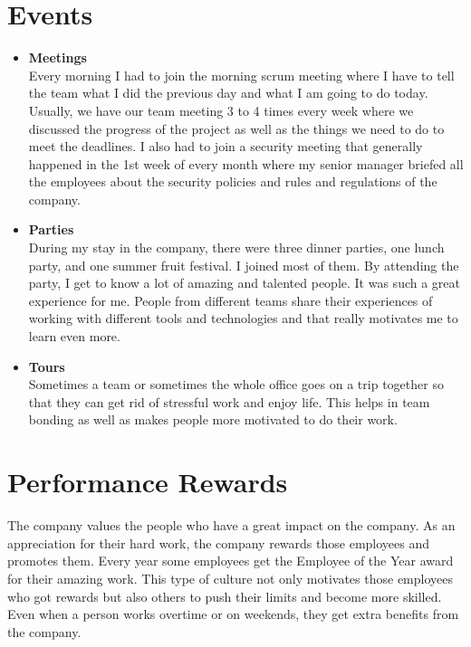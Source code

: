 \section{Events}
\begin{flushleft}
\begin{itemize}
    \item \textbf{Meetings}\\
    \vspace{6pt}
Every morning I had to join the morning scrum meeting where I have to tell the team
what I did the previous day and what I am going to do today. Usually, we have our team
meeting 3 to 4 times every week where we discussed the progress of the project as well
as the things we need to do to meet the deadlines.
I also had to join a security meeting that generally happened in the 1st week of every
month where my senior manager briefed all the employees about the security policies
and rules and regulations of the company.
\item \textbf{Parties}\\
\vspace{6pt}
During my stay in the company, there were three dinner parties, one lunch party, and
one summer fruit festival. I joined most of them. By attending the party, I get to know a
lot of amazing and talented people. It was such a great experience for me. People from
different teams share their experiences of working with different tools and technologies
and that really motivates me to learn even more.
\item \textbf{Tours}\\
\vspace{6pt}
Sometimes a team or sometimes the whole office goes on a trip together so that they
can get rid of stressful work and enjoy life. This helps in team bonding as well as makes
people more motivated to do their work.
\end{itemize}
   


\end{flushleft}

\section{Performance Rewards}
\begin{flushleft}
    The company values the people who have a great impact on the company. As an appreciation
for their hard work, the company rewards those employees and promotes them. Every year
some employees get the Employee of the Year award for their amazing work. This type of
culture not only motivates those employees who got rewards but also others to push their limits
and become more skilled. Even when a person works overtime or on weekends, they get extra
benefits from the company.

\end{flushleft}


